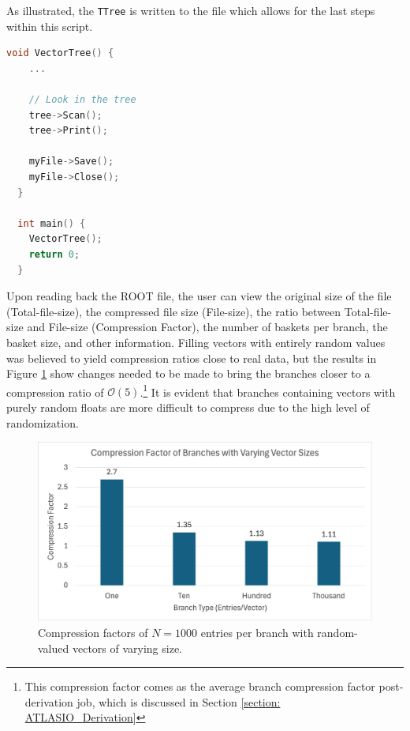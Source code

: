 As illustrated, the \verb|TTree| is written to the file which allows for the last steps within this script. 

\begin{lstlisting}[language=C]  
  void VectorTree() {
    ...

    // Look in the tree
    tree->Scan();
    tree->Print();

    myFile->Save();
    myFile->Close();
  }

  int main() {
    VectorTree();
    return 0;
  } 
\end{lstlisting}

Upon reading back the ROOT file, the user can view the original size of the file (Total-file-size), the compressed file size (File-size), the ratio between Total-file-size and File-size (Compression Factor), the number of baskets per branch, the basket size, and other information. 
Filling vectors with entirely random values was believed to yield compression ratios close to real data, but the results in Figure \ref{fig:toymodel_compF_rndm_vectors} show changes needed to be made to bring the branches closer to a compression ratio of $\mathcal{O}(5)$.\footnote{This compression factor comes as the average branch compression factor post-derivation job, which is discussed in Section \ref{section: ATLASIO_Derivation}} 
It is evident that branches containing vectors with purely random floats are more difficult to compress due to the high level of randomization.

\begin{figure}[h]
    \centering
    \includegraphics[width=.8\textwidth]{content/toymodel_content/branch_compfacts_nomix.png}
    \caption{Compression factors of $N=1000$ entries per branch with random-valued vectors of varying size.}
    \label{fig:toymodel_compF_rndm_vectors}
\end{figure}


